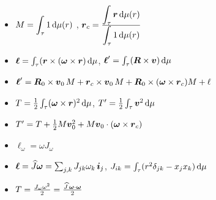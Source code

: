 \documentclass[draft,landscape,timbord]{notes}
\begin{document}
\begin{multicols*}{3}
\begin{enumerate}
    \begin{itemize}
      \item $M = {\displaystyle\int_\tau  1 \, \mathrm{d} \mu(r) }$
      , $\v r_c = \frac{\dint_\tau \v r \, \del \mu(r)}{\dint_\tau  1 \, \del \mu(r) } $
      \item $\v {\ell} = \int_\tau (\v r \times (\v \omega \times \v r) \, \del \mu$,
        $\v \ell' = \int_\tau (\v R \times \v v) \, \del \mu$
      \item $
        \begin{aligned}
          \v \ell' &= \v R_0 \times \v v_0 \, M + \v r_c \times \v v_0 \, M + \v R_0 
          \times (\v \omega \times \v r_c) M + \ell
        \end{aligned}
        $
      \item $T  = \frac 1 2 \int_\tau (\v \omega \times \v r)^2 \, \del \mu$,
            $T' = \frac 1 2 \int_\tau {\v v}^2 \, \del \mu$
      \item $T' = T + \frac 1 2 M \v v_0^2 + M \v v_0 \cdot (\v \omega \times \v r_c)$
      \item $\ell_\omega = \omega J_\omega  $
      \item $\v \ell = \ov^ J \v \omega = \sum_{j,k} J_{jk} \omega_k \,\v i_j$, 
        $J_{ik} = \int_\tau (r^2 \delta_{jk} - x_j x_k) \, \mathrm{d} \mu $
      \item $T = \frac{J_\omega \omega ^2}{2} = \frac{\ov^ J \, \v \omega \cdot \v \omega}{2} $
    \end{itemize}
  \end{enumerate}
\end{multicols*}
\end{document}
